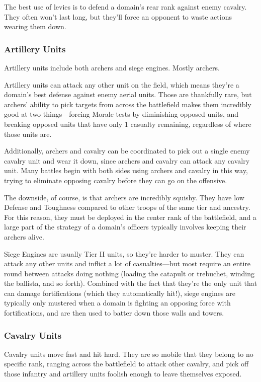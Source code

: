 \documentclass[10pt,a4paper,twoside,bg=print,twocolumn,openany,nodeprecatedcode]{dndbook}
\begin{document}
The best use of levies is to defend a domain's rear rank against enemy cavalry. They often won't last long, but they'll force an opponent to waste actions wearing them down.

\subsubsection{Artillery Units}
Artillery units include both archers and siege engines. Mostly archers.

Artillery units can attack any other unit on the field, which means they're a domain's best defense against enemy aerial units. Those are thankfully rare, but archers' ability to pick targets from across the battlefield makes them incredibly good at two things—forcing Morale tests by diminishing opposed units, and breaking opposed units that have only 1 casualty remaining, regardless of where those units are.

Additionally, archers and cavalry can be coordinated to pick out a single enemy cavalry unit and wear it down, since archers and cavalry can attack any cavalry unit. Many battles begin with both sides using archers and cavalry in this way, trying to eliminate opposing cavalry before they can go on the offensive.

The downside, of course, is that archers are incredibly squishy. They have low Defense and Toughness compared to other troops of the same tier and ancestry. For this reason, they must be deployed in the center rank of the battlefield, and a large part of the strategy of a domain's officers typically involves keeping their archers alive.

Siege Engines are usually Tier II units, so they're harder to muster. They can attack any other units and inflict a lot of casualties—but most require an entire round between attacks doing nothing (loading the catapult or trebuchet, winding the ballista, and so forth). Combined with the fact that they're the only unit that can damage fortifications (which they automatically hit!), siege engines are typically only mustered when a domain is fighting an opposing force with fortifications, and are then used to batter down those walls and towers.

\subsubsection{Cavalry Units}
Cavalry units move fast and hit hard. They are so mobile that they belong to no specific rank, ranging across the battlefield to attack other cavalry, and pick off those infantry and artillery units foolish enough to leave themselves exposed.
\end{document}
